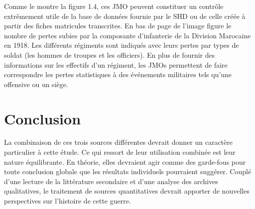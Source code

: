 Comme le montre la figure 1.4, ces JMO peuvent constituer un contrôle extrêmement utile de la base de données fournie par le SHD ou de celle créée à partir des fiches matricules transcrites. En bas de page de l’image figure le nombre de pertes subies par la composante d’infanterie de la Division Marocaine  en 1918. Les différents régiments sont indiqués avec leurs pertes par types de soldat (les hommes de troupes et les officiers). En plus de fournir des informations sur les effectifs d’un régiment, les JMOs permettent de faire correspondre les pertes statistiques à des événements militaires tels qu’une offensive ou un siège.\\

\section{Conclusion}
La combinaison de ces trois sources différentes devrait donner un caractère particulier à cette étude. Ce qui ressort de leur utilisation combinée est leur nature équilibrante. En théorie, elles devraient agir comme des garde-fous pour toute conclusion globale que les résultats individuels pourraient suggérer. Couplé d’une lecture de la littérature secondaire et d’une analyse des archives qualitatives, le traitement de sources quantitatives devrait apporter de nouvelles perspectives sur l’histoire de cette guerre. 